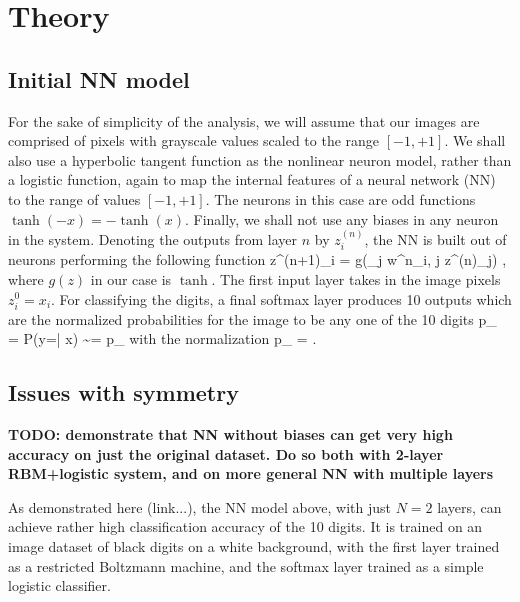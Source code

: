 \documentclass[twocolumn, prl]{revtex4-1}
\begin{document}


\section{Theory}
\subsection{Initial NN model}
\label{Sec:dumb_NN}

For the sake of simplicity of the analysis, we will assume that our images are comprised of pixels with grayscale values scaled to the 
range $[-1,+1]$. We shall also use a hyperbolic tangent function as the nonlinear neuron model, rather than a logistic function, again to map the internal features of a neural network (NN) to the range of values $[-1, +1]$. The neurons in this case are odd functions $\tanh(-x) = - \tanh(x)$.
Finally, we shall not use any biases in any neuron in the system. Denoting the outputs from layer $n$ by $z^{(n)}_i$, the NN is built out of neurons performing the following function
\be
z^{(n+1)}_i = g\left(\sum_j w^n_{i, j} z^{(n)}_j\right)
\; ,
\ee
where $g(z)$ in our case is $\tanh$.
The first input layer takes in the image pixels $z^0_i = x_i$. For classifying the digits, a final softmax layer produces 10 outputs which are the normalized probabilities for the image to be any one of the 10 digits
\be
p_{\alpha} = P(y=\alpha | x) \sim \exp{} = {\tilde p}_{\alpha}
\ee
with the normalization
\be
p_{\alpha} = 
\; .
\ee

\subsection{Issues with symmetry}

{\bf TODO: demonstrate that NN without biases can get very high accuracy on just the original dataset. Do so both with 2-layer RBM+logistic system, and on more general NN with multiple layers}

As demonstrated here (link...), the NN model above, with just $N=2$ layers, can achieve rather high classification accuracy of the 10 digits.
It is trained on an image dataset of black digits on a white background, with the first layer trained as a restricted Boltzmann machine, and the softmax layer trained as a simple logistic classifier.
\end{document}

